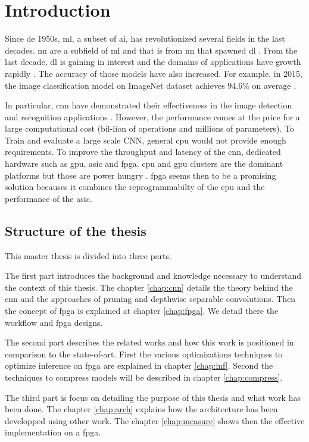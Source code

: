 \chapter{Introduction}
\tab Since de 1950s, \acrfull{ml}, a subset of \acrfull{ai}, has revolutionized several fields in the last decades. \acrfull{nn} are a subfield of \acrshort{ml} and that is from \acrshort{nn} that spawned \acrfull{dl}  \cite{alom_history_2018}. From the last decade, \acrshort{dl} is gaining in interest and the domains of applications have growth rapidly \cite{wason_deep_2018}. The accuracy of those models have also increased. For example, in 2015, the image classification model on ImageNet dataset achieves 94.6\% on average \cite{russakovsky_imagenet_2015}.\newline

In particular, \acrfull{cnn} have demonstrated their effectiveness in the image detection and recognition applications \cite{shawahna_fpga-based_2019}. However, the performance comes at the price for a large computational cost (bil-lion of operations and millions of parameters). To Train and evaluate a large scale CNN, general \acrshort{cpu} would not provide enough requirements. To improve the throughput and latency of the \acrshort{cnn}, dedicated hardware such as \acrfull{gpu}, \acrfull{asic} and \acrfull{fpga}. \acrshort{cpu} and \acrshort{gpu} clusters are the dominant platforms but those are power hungry \cite{liu_uniform_2019}. \acrshort{fpga} seems then to be a promising solution becauses it combines the reprogrammabilty of the \acrshort{cpu} and the performance of the \acrshort{asic}.
\section*{Structure of the thesis}
\tab This master thesis is divided into three parts. \newline

The first part introduces the background and knowledge necessary to understand the context of this thesis. The chapter \ref{chap:cnn} details the theory behind the \acrshort{cnn} and the approaches of pruning and depthwise separable convolutions. Then the concept of \acrshort{fpga} is explained at chapter \ref{chap:fpga}. We detail there the workflow and \acrshort{fpga} designs. \newline

The second part describes the related works and how this work is positioned in comparison to the state-of-art. First the various optimizations techniques to optimize inference on \acrshort{fpga} are explained in chapter \ref{chap:inf}. Second the techniques to compress models will be described in chapter \ref{chap:compress}. \newline

The third part is focus on detailing the purpose of this thesis and what work has been done. The chapter \ref{chap:arch} explains how the architecture has been developped using other work. The chapter \ref{chap:measure} shows then the effective implementation on a \acrshort{fpga}.
\afterpage{\blankpage}
\newpage
